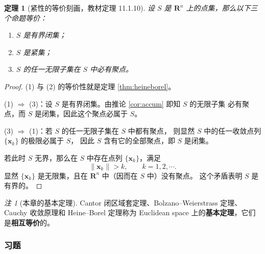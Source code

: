 \documentclass[11pt]{ctexart}
\theoremstyle{plain}
\newtheorem{thm}{定理}[section]
\theoremstyle{definition}
\theoremstyle{remark}
\newtheorem*{rem}{注}
\begin{document}
\begin{thm}[紧性的等价刻画，教材定理 11.1.10]\label{thm:compacteq}
设 \(S\) 是 \(\mathbf{R}^n\) 上的点集，那么以下三个命题等价：
\begin{enumerate}
  \item \(S\) 是有界闭集；
  \item \(S\) 是紧集；
  \item \(S\) 的任一无限子集在 \(S\) 中必有聚点。
\end{enumerate}
\end{thm}

\begin{proof}
(1) 与 (2) 的等价性就是定理 \ref{thm:heineborel}。

(1) \(\Rightarrow\) (3)：设 \(S\) 是有界闭集。由推论 \ref{cor:accum} 即知 \(S\) 的无限子集
必有聚点，而 \(S\) 是闭集，因此这个聚点必属于 \(S\)。

(3) \(\Rightarrow\) (1)：若 \(S\) 的任一无限子集在 \(S\) 中都有聚点，
则显然 \(S\) 中的任一收敛点列 \(\{\boldsymbol{x}_k\}\) 的极限必属于 \(S\)，
因此 \(S\) 含有它的全部聚点，即 \(S\) 是闭集。

若此时 \(S\) 无界，那么在 \(S\) 中存在点列 \(\{\boldsymbol{x}_k\}\)，满足
\[
  \|\boldsymbol{x}_k\|>k,\qquad k=1,2,\cdots .
\]
显然 \(\{\boldsymbol{x}_k\}\) 是无限集，且在 \(\mathbf{R}^n\) 中（因而在 \(S\) 中）没有聚点。
这个矛盾表明 \(S\) 是有界的。
\end{proof}

\begin{rem}[本章的基本定理]
Cantor 闭区域套定理、Bolzano--Weierstrass 定理、Cauchy 收敛原理和
Heine--Borel 定理称为 Euclidean space 上的\textbf{基本定理}，它们是\textbf{相互等价}的。
\end{rem}

\subsubsection{习题}
\end{document}
